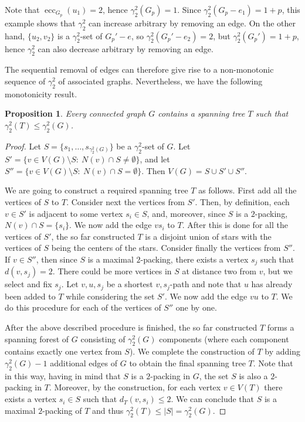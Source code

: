 \documentclass[12pt]{article}
\newtheorem{proposition}[theorem]{Proposition}
\newcommand{\mrho}{\gamma_2^2}
\DeclareMathOperator{\ecc}{ecc}
\begin{document}
Note that $\ecc_{G_p}(u_1) = 2$, hence $\mrho(G_p)=1$. Since $\mrho(G_p-e_1)=1+p$, this example shows that $\mrho$ can increase arbitrary by removing an edge. On the other hand, $\{u_2, v_2\}$ is a $\mrho$-set of $G_p'-e$, so $\mrho(G_p'-e_2)=2$, but $\mrho(G_p') =  1+p$, hence $\mrho$ can also decrease arbitrary by removing an edge.

The sequential removal of edges can therefore give rise to a non-monotonic sequence of $\mrho$ of associated graphs. Nevertheless, we have the following monotonicity result. 

\begin{proposition}
\label{prop:spanning-trees}
Every connected graph $G$ contains a spanning tree $T$ such that $\mrho(T) \leq \mrho(G)$.
\end{proposition}

\begin{proof}
Let $S = \{s_1, \ldots, s_{\mrho(G)}\}$ be a $\mrho$-set of $G$. Let $S' = \{v\in V(G)\setminus S:\ N(v)\cap S \ne \emptyset\}$, and let $S'' = \{v\in V(G)\setminus S:\ N(v)\cap S = \emptyset\}$. Then $V(G) = S \cup S'\cup S''$.

We are going to construct a required spanning tree $T$ as follows. First add all the vertices of $S$ to $T$. Consider next the vertices from $S'$. Then, by definition, each $v\in S'$ is adjacent to some vertex $s_i\in S$, and, moreover, since $S$ is a $2$-packing, $N(v) \cap S = \{s_i\}$. We now add the edge $vs_i$ to $T$. After this is done for all the vertices of $S'$, the so far constructed $T$ is a disjoint union of stars with the vertices of $S$ being the centers of the stars. Consider finally the vertices from $S''$. If $v\in S''$, then since $S$ is a maximal $2$-packing, there exists a vertex $s_j$ such that $d(v,s_j) = 2$. There could be more vertices in $S$ at distance two from $v$, but we select and fix $s_j$. Let $v, u, s_j$ be a shortest $v,s_j$-path and note that $u$ has already been added to $T$ while considering the set $S'$. We now add the edge $vu$ to $T$. We do this procedure for each of the vertices of $S''$ one by one.

After the above described procedure is finished, the so far constructed $T$ forms a spanning forest of $G$ consisting of $\mrho(G)$ components (where each component contains exactly one vertex from $S$). We complete the construction of $T$ by adding $\mrho(G)-1$ additional edges of $G$ to obtain the final spanning tree $T$. Note that in this way, having in mind that $S$ is a $2$-packing in $G$, the set $S$ is also a $2$-packing in $T$. Moreover, by the construction, for each vertex $v\in V(T)$ there exists a vertex $s_i\in S$ such that $d_T(v,s_i) \le 2$. We can conclude that $S$ is a maximal $2$-packing of $T$ and thus $\mrho(T) \le |S| = \mrho(G)$.
\end{proof}
\end{document}
